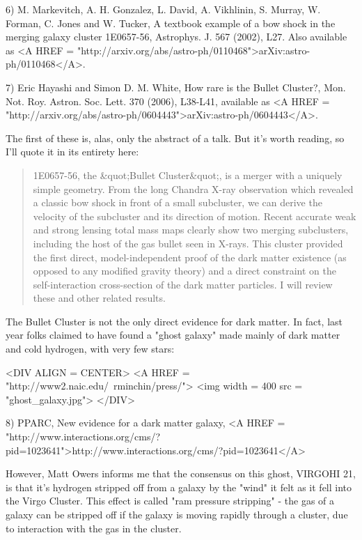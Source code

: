 6) M. Markevitch, A. H. Gonzalez, L. David, A. Vikhlinin, S. Murray,
W. Forman, C. Jones and W. Tucker, A textbook example of a bow shock
in the merging galaxy cluster 1E0657-56, Astrophys. J. 567 (2002),
L27.  Also available as <A HREF =
"http://arxiv.org/abs/astro-ph/0110468">arXiv:astro-ph/0110468</A>.

7) Eric Hayashi and Simon D. M. White, How rare is the Bullet
Cluster?, Mon. Not. Roy. Astron. Soc. Lett. 370 (2006), L38-L41,
available as <A HREF =
"http://arxiv.org/abs/astro-ph/0604443">arXiv:astro-ph/0604443</A>.

The first of these is, alas, only the abstract of a talk.  
But it's worth reading, so I'll quote it in its entirety here:

\begin{quote}
1E0657-56, the &quot;Bullet Cluster&quot;, is a merger with a uniquely 
simple geometry. From the long Chandra X-ray observation which revealed 
a classic bow shock in front of a small subcluster, we can derive the 
velocity of the subcluster and its direction of motion. Recent accurate 
weak and strong lensing total mass maps clearly show two merging subclusters, 
including the host of the gas bullet seen in X-rays. This cluster provided 
the first direct, model-independent proof of the dark matter existence 
(as opposed to any modified gravity theory) and a direct constraint on 
the self-interaction cross-section of the dark matter particles. I will 
review these and other related results.
\end{quote}
    

The Bullet Cluster is not the only direct evidence for dark 
matter.  In fact, last year folks claimed to have found
a "ghost galaxy" made mainly of dark matter
and cold hydrogen, with very few stars:

<DIV ALIGN = CENTER>
<A HREF = "http://www2.naic.edu/~rminchin/press/">
<img width = 400 src = "ghost_galaxy.jpg">
</DIV>

8) PPARC, New evidence for a dark matter galaxy, 
<A HREF = "http://www.interactions.org/cms/?pid=1023641">http://www.interactions.org/cms/?pid=1023641</A>

However, Matt Owers informs me that the consensus on this
ghost, VIRGOHI 21, is that it's hydrogen stripped off
from a galaxy by the "wind" it felt as 
it fell into the Virgo Cluster.  This effect is called 
"ram pressure stripping" - the gas of a galaxy can be
stripped off if the galaxy is moving rapidly through a cluster, due 
to interaction with the gas in the cluster.

